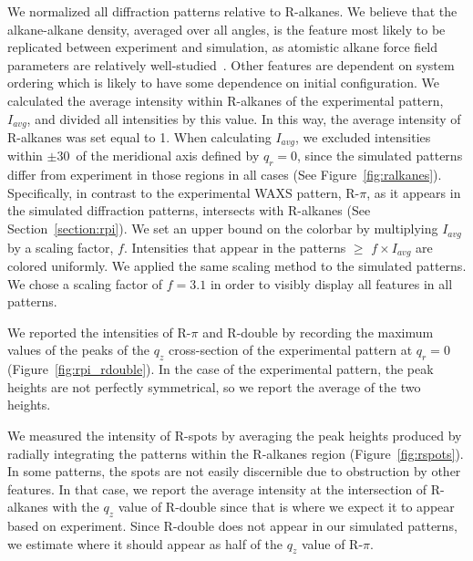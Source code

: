   We normalized all diffraction patterns relative to R-alkanes. We believe that
  the alkane-alkane density, averaged over all angles, is the feature most likely
  to be replicated between experiment and simulation, as atomistic alkane force
  field parameters are relatively well-studied~\cite{wang_development_2004}.
  Other features are dependent on system ordering which is likely to have some
  dependence on initial configuration.  We calculated the average intensity
  within R-alkanes of the experimental pattern, $I_{avg}$, and divided all
  intensities by this value. In this way, the average intensity of R-alkanes was
  set equal to 1. When calculating $I_{avg}$, we excluded intensities within
  $\pm$30\degree~of the meridional axis defined by $q_r=0$, since the simulated
  patterns differ from experiment in those regions in all cases (See
  Figure~\ref{fig:ralkanes}). Specifically, in contrast to the experimental WAXS
  pattern, R-$\pi$, as it appears in the simulated diffraction patterns,
  intersects with R-alkanes (See Section~\ref{section:rpi}). We set an upper bound
  on the colorbar by multiplying $I_{avg}$ by a scaling factor, $f$.  Intensities
  that appear in the patterns $\geq$ $f\times I_{avg}$ are colored uniformly.  We
  applied the same scaling method to the simulated patterns. We chose a scaling
  factor of $f=3.1$ in order to visibly display all features in all patterns.

  We reported the intensities of R-$\pi$ and R-double by recording the maximum values
  of the peaks of the $q_z$ cross-section of the experimental pattern at $q_r=0$ 
  (Figure~\ref{fig:rpi_rdouble}). In the case of the experimental pattern, the peak
  heights are not perfectly symmetrical, so we report the average of the two heights.

  We measured the intensity of R-spots by averaging the peak heights produced
  by radially integrating the patterns within the R-alkanes region
  (Figure~\ref{fig:rspots}). In some patterns, the spots are not easily
  discernible due to obstruction by other features. In that case, we report the
  average intensity at the intersection of R-alkanes with the $q_z$ value of
  R-double since that is where we expect it to appear based on experiment. Since
  R-double does not appear in our simulated patterns, we estimate where it should
  appear as half of the $q_z$ value of R-$\pi$.

